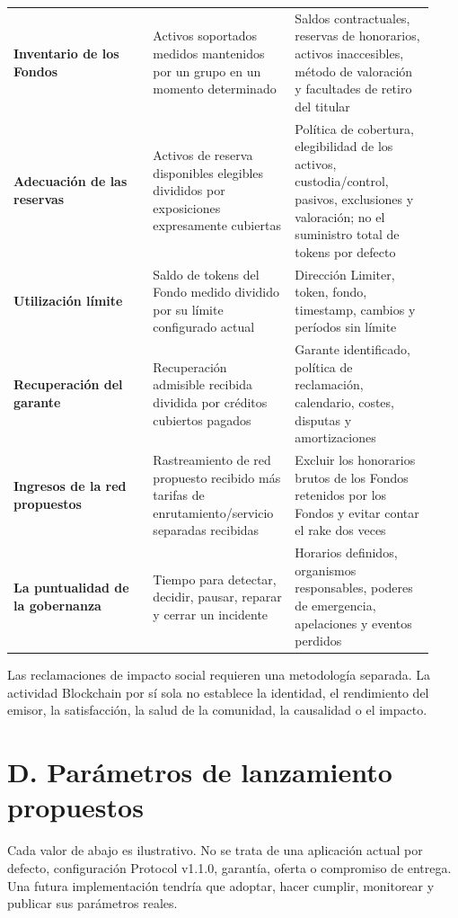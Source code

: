 \documentclass[11pt]{article}
\begin{document}
\begin{longtable}{P{0.31\linewidth} P{0.31\linewidth} P{0.31\linewidth}}
\textbf{Inventario de los Fondos} & Activos soportados medidos mantenidos por un grupo en un momento determinado & Saldos contractuales, reservas de honorarios, activos inaccesibles, método de valoración y facultades de retiro del titular \\
\textbf{Adecuación de las reservas} & Activos de reserva disponibles elegibles divididos por exposiciones expresamente cubiertas & Política de cobertura, elegibilidad de los activos, custodia/control, pasivos, exclusiones y valoración; no el suministro total de tokens por defecto \\
\textbf{Utilización límite} & Saldo de tokens del Fondo medido dividido por su límite configurado actual & Dirección Limiter, token, fondo, timestamp, cambios y períodos sin límite \\
\textbf{Recuperación del garante} & Recuperación admisible recibida dividida por créditos cubiertos pagados & Garante identificado, política de reclamación, calendario, costes, disputas y amortizaciones \\
\textbf{Ingresos de la red propuestos} & Rastreamiento de red propuesto recibido más tarifas de enrutamiento/servicio separadas recibidas & Excluir los honorarios brutos de los Fondos retenidos por los Fondos y evitar contar el rake dos veces \\
\textbf{La puntualidad de la gobernanza} & Tiempo para detectar, decidir, pausar, reparar y cerrar un incidente & Horarios definidos, organismos responsables, poderes de emergencia, apelaciones y eventos perdidos \\
\bottomrule
\end{longtable}

Las reclamaciones de impacto social requieren una metodología separada. La actividad Blockchain por sí sola no establece la identidad, el rendimiento del emisor, la satisfacción, la salud de la comunidad, la causalidad o el impacto.


\section*{D. Parámetros de lanzamiento propuestos}

Cada valor de abajo es ilustrativo. No se trata de una aplicación actual por defecto, configuración Protocol v1.1.0, garantía, oferta o compromiso de entrega. Una futura implementación tendría que adoptar, hacer cumplir, monitorear y publicar sus parámetros reales.
\end{document}
